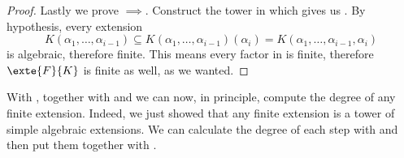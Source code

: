 \documentclass[12pt,oneside]{book}
\begin{document}
{\begin{proof}
	Lastly we prove \( \implies \). Construct the tower in
	 which gives us . By hypothesis, every
	extension
	\begin{equation*}
 		K(\alpha_1, \dots, \alpha_{i-1}) \subseteq K(\alpha_1, \dots, \alpha_{i-1})(\alpha_i) = K(\alpha_1, \dots, \alpha_{i-1}, \alpha_i)
	\end{equation*}
	is algebraic, therefore finite. This means every factor in  is
	finite, therefore	\( \exte{F}{K} \) is finite as well, as we wanted.
\end{proof}
}
\parbreak

With , together with 
and  we can now, in principle, compute
the degree of any finite extension. Indeed, we just showed that any finite extension is a
tower of simple algebraic extensions. We can calculate the degree of each step with
 and then put them together with
. 
\end{document}
